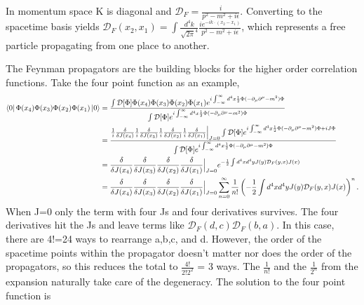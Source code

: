 In momentum space K is diagonal and $\mathcal{D}_F = \frac{i}{p^2-m^2 + i\epsilon}$. Converting to the spacetime basis yields $\mathcal{D}_F(x_2,x_1) = \int \frac{d^4k}{\sqrt{2\pi}^4}\frac{i e^{-ik\cdot(x_2-x_1)}}{p^2-m^2 + i\epsilon}$, which represents a free particle propagating from one place to another.  

The Feynman propagators are the building blocks for the higher order correlation functions. Take the four point function as an example,
\begin{equation}
\begin{split}
\bra{0}\Phi(x_4)\Phi(x_3)\Phi(x_2)\Phi(x_1)\ket{0} &= 
\frac{\int \mathcal{D}[\Phi]\Phi(x_4)\Phi(x_3)\Phi(x_2)\Phi(x_1)e^{i\int_{-\infty}^{\infty} d^4x \frac{1}{2}\Phi (-\partial_\mu\partial^\mu - m^2)\Phi}}
{\int \mathcal{D}[\Phi]e^{i\int_{-\infty}^{\infty} d^4x \frac{1}{2}\Phi (-\partial_\mu\partial^\mu - m^2)\Phi}} \\
&= \frac{\frac{1}{i}\frac{\delta}{\delta J(x_4)}\frac{1}{i}\frac{\delta}{\delta J(x_3)}\frac{1}{i}\frac{\delta}{\delta J(x_2)}\frac{1}{i}\frac{\delta}{\delta J(x_1)}\Big|_{J=0}\int \mathcal{D}[\Phi]e^{i\int_{-\infty}^{\infty} d^4x \frac{1}{2}\Phi (-\partial_\mu\partial^\mu - m^2)\Phi + iJ\Phi}}
{\int \mathcal{D}[\Phi]e^{i\int_{-\infty}^{\infty} d^4x \frac{1}{2}\Phi (-\partial_\mu\partial^\mu - m^2)\Phi}} \\
&= \frac{\delta}{\delta J(x_4)}\frac{\delta}{\delta J(x_3)}\frac{\delta}{\delta J(x_2)}\frac{\delta}{\delta J(x_1)}\Big|_{J=0}e^{-\frac{1}{2}\int d^4x d^4y J(y) \mathcal{D}_F(y,x) J(x)} \\
&= \frac{\delta}{\delta J(x_4)}\frac{\delta}{\delta J(x_3)}\frac{\delta}{\delta J(x_2)}\frac{\delta}{\delta J(x_1)}\Big|_{J=0} 
\sum_{n=0}^\infty \frac{1}{n!}\left( -\frac{1}{2}\int d^4x d^4y J(y) \mathcal{D}_F(y,x) J(x) \right)^n. 
\end{split}
\end{equation}
When J=0 only the term with four Js and four derivatives survives. The four derivatives hit the Js and leave terms like $\mathcal{D}_F(d,c) \mathcal{D}_F(b,a)$. In this case, there are 4!=24 ways to rearrange a,b,c, and d. However, the order of the spacetime points within the propagator doesn't matter nor does the order of the propagators, so this reduces the total to $\frac{4!}{2!2^2}$ = 3 ways. The $\frac{1}{n!}$ and the $\frac{1}{2^n}$ from the expansion naturally take care of the degeneracy. The solution to the four point function is
